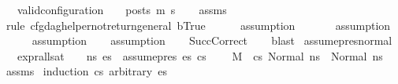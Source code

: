 \begin{isabellebody}
\ \ \ {\isachardoublequoteopen}valid{\isacharunderscore}{\kern0pt}configuration\ {\isasymLambda}\ {\isasymGamma}\ {\isasymOmega}\ posts\ m{\isacharprime}{\kern0pt}\ s{\isacharprime}{\kern0pt}{\isachardoublequoteclose}\isanewline
%
\isadelimproof
\ \ %
\endisadelimproof
%
\isatagproof
{}\isamarkupfalse%
\ assms{\isacharparenleft}{\kern0pt}{}{\isacharminus}{\kern0pt}{}{\isacharparenright}{\kern0pt}\isanewline
\ \ \isamarkupfalse%
\ {\isacharparenleft}{\kern0pt}rule\ cfg{\isacharunderscore}{\kern0pt}dag{\isacharunderscore}{\kern0pt}helper{\isacharunderscore}{\kern0pt}not{\isacharunderscore}{\kern0pt}return{\isacharunderscore}{\kern0pt}general{\isacharbrackleft}{\kern0pt}\ {\isacharquery}{\kern0pt}b{\isacharequal}{\kern0pt}True{\isacharbrackright}{\kern0pt}{\isacharparenright}{\kern0pt}\isanewline
\ \ \ \ \isamarkupfalse%
\ assumption\isanewline
\ \ \ \ \ \isamarkupfalse%
\ assumption\isanewline
\ \ \ \ \isamarkupfalse%
\ assumption\isanewline
\ \ \isamarkupfalse%
\ assumption\isanewline
\ \ \isamarkupfalse%
\ SuccCorrect\isanewline
\ \ \isamarkupfalse%
\ blast%
\endisatagproof
{\isafoldproof}%
%
\isadelimproof
\isanewline
%
\endisadelimproof
\isanewline
{}\isamarkupfalse%
\ assume{\isacharunderscore}{\kern0pt}pres{\isacharunderscore}{\kern0pt}normal{\isacharcolon}{\kern0pt}\isanewline
\ \ \ {\isachardoublequoteopen}expr{\isacharunderscore}{\kern0pt}all{\isacharunderscore}{\kern0pt}sat\ {\isasymLambda}\ {\isasymGamma}\ {\isasymOmega}\ ns\ es{\isachardoublequoteclose}\ \ {\isachardoublequoteopen}assume{\isacharunderscore}{\kern0pt}pres\ es\ cs{\isachardoublequoteclose}\ \isanewline
\ \ \ {\isachardoublequoteopen}M{\isacharcomma}{\kern0pt}{\isasymLambda}{\isacharcomma}{\kern0pt}{\isasymGamma}{\isacharcomma}{\kern0pt}{\isasymOmega}\ {\isasymturnstile}\ {\isasymlangle}cs{\isacharcomma}{\kern0pt}\ Normal\ ns{\isasymrangle}\ {\isacharbrackleft}{\kern0pt}{\isasymrightarrow}{\isacharbrackright}{\kern0pt}\ Normal\ ns{\isachardoublequoteclose}\isanewline
%
\isadelimproof
\ \ %
\endisadelimproof
%
\isatagproof
{}\isamarkupfalse%
\ assms\isanewline
{}\isamarkupfalse%
\ {\isacharparenleft}{\kern0pt}induction\ cs\ arbitrary{\isacharcolon}{\kern0pt}\ es{\isacharparenright}{\kern0pt}\isanewline
\ \ \isamarkupfalse%

\end{isabellebody}
